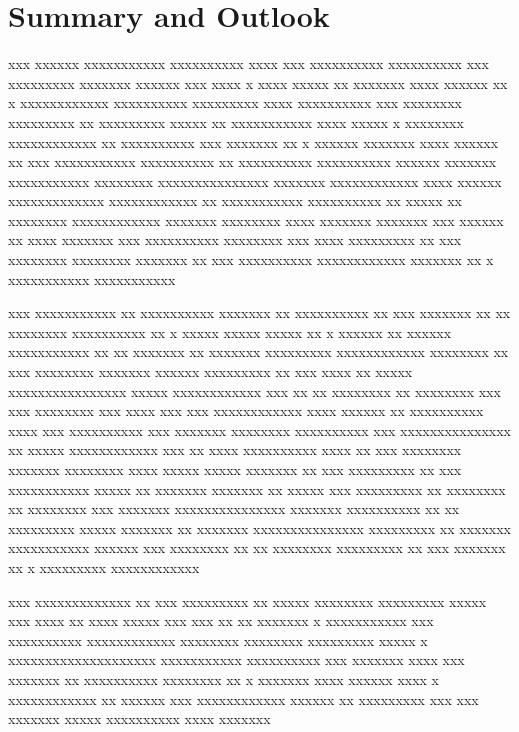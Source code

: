 %
\chapter{Summary and Outlook}\label{chap:xxxx}
\begin{otherlanguage}{english}
xxx xxxxxx xxxxxxxxxxx xxxxxxxxxx xxxx xxx xxxxxxxxxx xxxxxxxxxx xxx xxxxxxxxx xxxxxxx xxxxxx xxx xxxx x xxxx xxxxx xx xxxxxxx xxxx xxxxxx xx x xxxxxxxxxxxx xxxxxxxxxx xxxxxxxxx xxxx xxxxxxxxxx xxx xxxxxxxx xxxxxxxxx xx xxxxxxxxx xxxxx xx xxxxxxxxxxx xxxx xxxxx x xxxxxxxx xxxxxxxxxxxx xx xxxxxxxxxx xxx xxxxxxx xx x xxxxxx xxxxxxx xxxx xxxxxx xx xxx xxxxxxxxxxx xxxxxxxxxx xx xxxxxxxxxx xxxxxxxxxx xxxxxx xxxxxxx xxxxxxxxxxx xxxxxxxx xxxxxxxxxxxxxxx xxxxxxx xxxxxxxxxxxx xxxx xxxxxx xxxxxxxxxxxxx xxxxxxxxxxxx xx xxxxxxxxxxx xxxxxxxxxx xx xxxxx xx xxxxxxxx xxxxxxxxxxxx xxxxxxx xxxxxxxx xxxx xxxxxxx xxxxxxx xxx xxxxxx xx xxxx xxxxxxx xxx xxxxxxxxxx xxxxxxxx xxx xxxx xxxxxxxxx xx xxx xxxxxxxx xxxxxxxx xxxxxxx xx xxx xxxxxxxxxx xxxxxxxxxxxx xxxxxxx xx x xxxxxxxxxxx xxxxxxxxxxx

xxx xxxxxxxxxxx xx xxxxxxxxxx xxxxxxx xx xxxxxxxxxx xx xxx xxxxxxx xx xx xxxxxxxx xxxxxxxxxx xx x xxxxx xxxxx xxxxx xx x xxxxxx xx xxxxxx xxxxxxxxxxx xx xx xxxxxxx xx xxxxxxx xxxxxxxxx xxxxxxxxxxxx xxxxxxxx xx xxx xxxxxxxx xxxxxxx xxxxxx xxxxxxxxx xx xxx xxxx xx xxxxx xxxxxxxxxxxxxxxx xxxxx xxxxxxxxxxxx xxx xx xx xxxxxxxx xx xxxxxxxx xxx xxx xxxxxxxx xxx xxxx xxx xxx xxxxxxxxxxxx xxxx xxxxxx xx xxxxxxxxxx xxxx xxx xxxxxxxxxx xxx xxxxxxx xxxxxxxx xxxxxxxxxx xxx xxxxxxxxxxxxxxx xx xxxxx xxxxxxxxxxxx xxx xx xxxx xxxxxxxxxx xxxx xx xxx xxxxxxxx xxxxxxx xxxxxxxx xxxx xxxxx xxxxx xxxxxxx xx xxx xxxxxxxxx xx xxx xxxxxxxxxxx xxxxx xx xxxxxxx xxxxxxx xx xxxxx xxx xxxxxxxxx xx xxxxxxxx xx xxxxxxxx xxx xxxxxxx xxxxxxxxxxxxxxx xxxxxxx xxxxxxxxxx xx xx xxxxxxxxx xxxxx xxxxxxx xx xxxxxxx xxxxxxxxxxxxxxx xxxxxxxxx xx xxxxxxx xxxxxxxxxxx xxxxxx xxx xxxxxxxx xx xx xxxxxxxx xxxxxxxxx xx xxx xxxxxxx xx x xxxxxxxxx xxxxxxxxxxxx

xxx xxxxxxxxxxxxx xx xxx xxxxxxxxx xx xxxxx xxxxxxxx xxxxxxxxx xxxxx xxx xxxx xx xxxx xxxxx xxx xxx xx xx xxxxxxx x xxxxxxxxxxx xxx xxxxxxxxxx xxxxxxxxxxxx xxxxxxxx xxxxxxxx xxxxxxxxx xxxxx x xxxxxxxxxxxxxxxxxxxx xxxxxxxxxxx xxxxxxxxxx xxx xxxxxxx xxxx xxx xxxxxxx xx xxxxxxxxxx xxxxxxxx xx x xxxxxxx xxxx xxxxxx xxxx x xxxxxxxxxxxx xx xxxxxx xxx xxxxxxxxxxxx xxxxxx xx xxxxxxxxx xxx xxx xxxxxxx xxxxx xxxxxxxxxx xxxx xxxxxxx


\end{otherlanguage}
